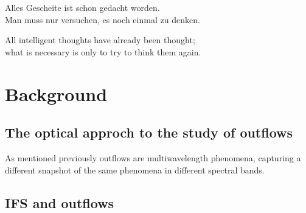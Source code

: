 \begin{savequote}[8cm]
Alles Gescheite ist schon gedacht worden.\\
Man muss nur versuchen, es noch einmal zu denken.

All intelligent thoughts have already been thought;\\
what is necessary is only to try to think them again.
\end{savequote}

\chapter{\label{ch:2-litreview}Background}

\minitoc

\section{The optical approch to the study of outflows}
As mentioned previously outflows are multiwavelength phenomena, capturing a different snapshot of the same phenomena in
different spectral bands.


\section{IFS and outflows}

